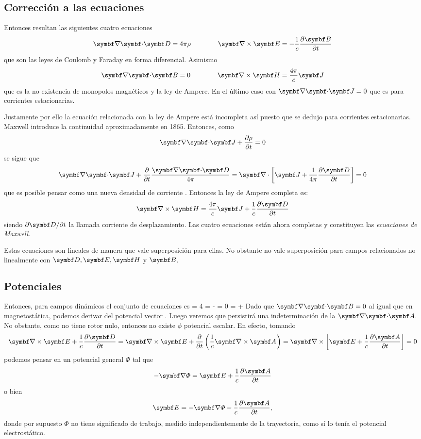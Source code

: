 \documentclass[10pt,oneside]{CBFT_book}
\begin{document}
\subsection{Corrección a las ecuaciones}

Entonces resultan las siguientes cuatro ecuaciones
\[
	\divem{D} = 4 \pi \rho \qquad \qquad \rotorm{E} = -\frac{1}{c} \dpar{\vb{B}}{t}
\]
que son las leyes de Coulomb y Faraday en forma diferencial. Asimismo
\[
	\divem{B} = 0 \qquad \qquad \rotorm{H} = \frac{4\pi}{c} \vb{J}
\]
que es la no existencia de monopolos magnéticos y la ley de Ampere. En el último caso con $\divem{J}=0$
que es para corrientes estacionarias.

Justamente por ello la ecuación relacionada con la ley de Ampere está incompleta así puesto que se dedujo
para corrientes estacionarias. Maxwell introduce la continuidad aproximadamente en 1865.
Entonces, como 
\[
	\divem{J} + \dpar{\rho}{t } = 0 
\]
se sigue que 
\[
	\divem{J} + \frac{\partial}{\partial t} \frac{\divem{D}}{4\pi} =
	\Nabla\cdot\left[ \vb{J} + \frac{1}{4\pi} \dpar{\vb{D}}{t} \right] = 0
\]
que es posible pensar como una nueva densidad de corriente . 
Entonces la ley de Ampere completa es:
\[
	\rotorm{H} = \frac{4\pi}{c} \vb{J} + \frac{1}{c}\dpar{\vb{D}}{t}
\]
siendo $\partial\vb{D}/\partial t$ la llamada corriente de desplazamiento. 
Las cuatro ecuaciones están ahora completas y constituyen las {\it ecuaciones de Maxwell}.

Estas ecuaciones son lineales de manera que vale superposición para ellas. No obstante no vale
superposición para campos relacionados no linealmente con $\vb{D}, \vb{E}, \vb{H}$ y $\vb{B}$.

\subsection{Potenciales}

Entonces, para campos dinámicos el conjunto de ecuaciones es
\be
	 = 4 \pi \rho \qquad \qquad {} = - 
	\label{maxwell_e}
\ee
\be
	 = 0 \qquad \qquad {} =   + 
	\label{maxwell_m}
\ee
Dado que $\divem{B} = 0$ al igual que en magnetostática, podemos derivar  del potencial 
vector . Luego veremos que persistirá una indeterminación de la $\divem{A}$. 
No obstante, como  no tiene rotor nulo, entonces no existe $\phi$ potencial escalar.
En efecto, tomando
\[
	\rotorm{E} + \frac{1}{c}\dpar{\vb{D}}{t} = 
	\rotorm{E} + \frac{\partial}{\partial t}\left( \frac{1}{c} 
	\rotorm{A}\right) = \Nabla\times\left[ \vb{E} + \frac{1}{c}\dpar{\vb{A}}{t}\right] = 0
\]
podemos pensar en un potencial general $\Phi$ tal que 
\[
	- \Nabla \Phi = \vb{E} + \frac{1}{c}\dpar{\vb{A}}{t}
\]
o bien 
\[
	\vb{E}  = -\Nabla \Phi - \frac{1}{c}\dpar{\vb{A}}{t},
\]
donde por supuesto $\Phi$ no tiene significado de trabajo, medido independientemente de la
trayectoria, como sí lo tenía el potencial electrostático.
\end{document}

